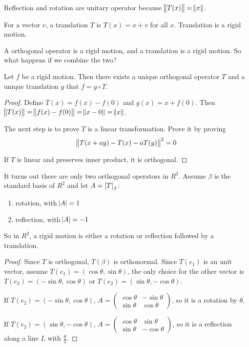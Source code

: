 Reflection and rotation are unitary operator because $\norm{T(x)} = \norm{x}$.

\begin{definition}
    For a vector $v$, a translation $T$ is $T(x) = x + v$ for all $x$. Translation is a rigid motion.
\end{definition}

A orthogonal operator is a rigid motion, and a translation is a rigid motion. So what happens if we combine the two?

\begin{theorem}
    Let $f$ be a rigid motion. Then there exists a unique orthogonal operator $T$ and a unique translation $g$ that $f = g  \circ T$.
\end{theorem}
\begin{proof}
    Define $T(x) = f(x) - f(0)$ and $g(x) = x + f(0)$. Then $\norm{T(x)} = \norm{f(x) - f(0)} = \norm{x - 0} = \norm{x}$.
    
    The next step is to prove $T$ is a linear transformation. Prove it by proving 
    \begin{equation*}
        \norm{T(x + a y) - T(x) - aT(y)}^2 = 0
    \end{equation*}
    
    If $T$ is linear and preserves inner product, it is orthogonal.
\end{proof}

\begin{theorem}
    It turns out there are only two orthogonal operators in $R^2$. Assume $\beta$ is the standard basis of $R^2$ and let $A = \coordinate{T}_\beta$:
\begin{enumerate}
    \item rotation, with $\abs{A} = 1$
    \item reflection, with $\abs{A} = -1$
\end{enumerate}

So in $R^2$, a rigid motion is either a rotation or reflection followed by a translation.
\end{theorem}
\begin{proof}
    Since $T$ is orthogonal, $T(\beta)$ is orthonormal. Since $T(e_1)$ is an unit vector, assume $T(e_1) = (\cos \theta, \sin \theta)$, the only choice for the other vector is $T(e_2) = (- \sin \theta, \cos \theta)$ or $T(e_2) = (\sin \theta, - \cos \theta)$.
    
    If $T(e_2) = (- \sin \theta, \cos \theta)$, $A = \begin{pmatrix}
                \cos \theta & - \sin \theta \\
        \sin \theta & \cos \theta
    \end{pmatrix}$, so it is a rotation by $\theta$.
    
    If $T(e_2) = (\sin \theta, - \cos \theta)$, $A = \begin{pmatrix}
        \cos \theta & \sin \theta \\
        \sin \theta & -\cos \theta
    \end{pmatrix}$, so it is a reflection along a line $L$ with $\displaystyle \frac{\theta}{2}$.
\end{proof}


